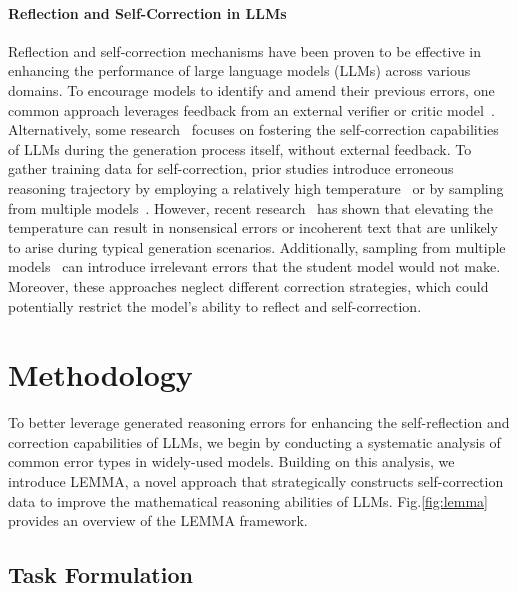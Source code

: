 \documentclass[11pt]{article}
\begin{document}
\paragraph{Reflection and Self-Correction in LLMs}
Reflection and self-correction mechanisms have been proven to be effective in enhancing the performance of large language models (LLMs) across various domains. To encourage models to identify and amend their previous errors, one common approach leverages feedback from an external verifier or critic model~\cite{an2023learning,li2023reflection,tong2024can,shinn2024reflexion,renze2024self,li2024dotamath,duimproving}. 
Alternatively, some research~\cite{weng-etal-2023-large,yang2024confidence,zhang-etal-2024-small,han2024small,yan2024s,wu2024tokenselect,wu2024large,qin2024o1,zhang-etal-2024-learn,lu2024step,kumar2024training} focuses on fostering the self-correction capabilities of LLMs during the generation process itself, without external feedback. 
To gather training data for self-correction, prior studies introduce erroneous reasoning trajectory by employing a relatively high temperature~\cite{xi2024enhancing,yan2024s,zhang-etal-2024-small,han2024small} or by sampling from multiple models~\cite{an2023learning}. However, recent research~\cite{lu2024step,renze-2024-effect} has shown that elevating the temperature can result in nonsensical errors or incoherent text that are unlikely to arise during typical generation scenarios. Additionally, sampling from multiple models~\cite{an2023learning} can introduce irrelevant errors that the student model would not make. Moreover, these approaches neglect different correction strategies, which could potentially restrict the model's ability to reflect and self-correction.

\section{Methodology}

To better leverage generated reasoning errors for enhancing the self-reflection and correction capabilities of LLMs, we begin by conducting a systematic analysis of common error types in widely-used models. Building on this analysis, we introduce LEMMA, a novel approach that strategically constructs self-correction data to improve the mathematical reasoning abilities of LLMs. Fig.\ref{fig:lemma} provides an overview of the LEMMA framework.



\subsection{Task Formulation}
\end{document}
